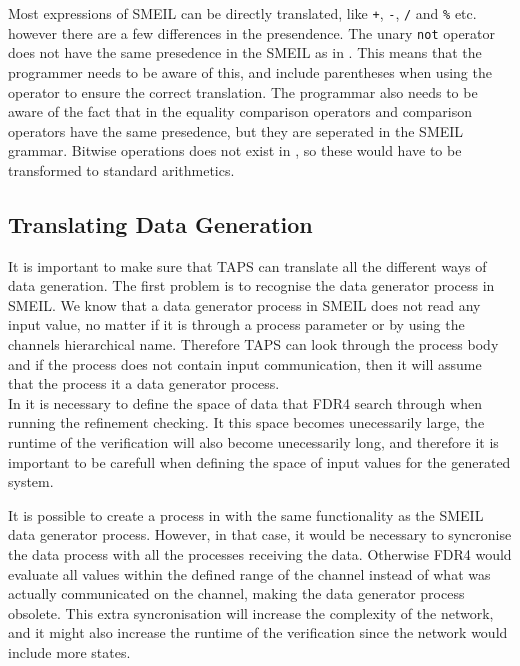 Most expressions of SMEIL can be directly translated, like \texttt{+}, \texttt{-}, \texttt{/} and \texttt{\%} etc. however there are a few differences in the presendence. The unary \texttt{not} operator does not have the same presedence in the SMEIL as in \cspm{}. This means that the programmer needs to be aware of this, and include parentheses when using the operator to ensure the correct translation. The programmar also needs to be aware of the fact that in \cspm{} the equality comparison operators and comparison operators have the same presedence, but they are seperated in the SMEIL grammar.
Bitwise operations does not exist in \cspm{}, so these would have to be transformed to standard arithmetics. %

\subsection{Translating Data Generation}
It is important to make sure that TAPS can translate all the different ways of data generation. The first problem is to recognise the data generator process in SMEIL. We know that a data generator process in SMEIL does not read any input value, no matter if it is through a process parameter or by using the channels hierarchical name. Therefore TAPS can look through the process body and if the process does not contain input communication, then it will assume that the process it a data generator process. \\

In \cspm it is necessary to define the space of data that FDR4 search through when running the refinement checking. It this space becomes unecessarily large, the runtime of the verification will also become unecessarily long, and therefore it is important to be carefull when defining the space of input values for the generated system.

It is possible to create a process in \cspm with the same functionality as the SMEIL data generator process. However, in that case, it would be necessary to syncronise the data process with all the processes receiving the data. Otherwise FDR4 would evaluate all values within the defined range of the channel instead of what was actually communicated on the channel, making the data generator process obsolete. This extra syncronisation will increase the complexity of the \cspm{} network, and it might also increase the runtime of the verification since the \cspm{} network would include more states.

